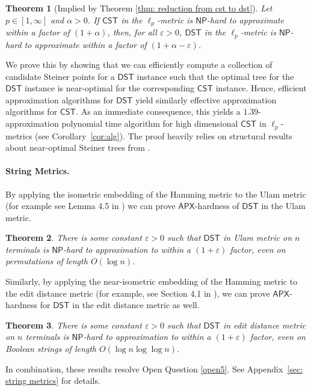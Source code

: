 \documentclass{article}\providecommand{\DeclareRedundantLanguages}[2]{}\usepackage[a4paper,margin=20mm]{geometry}
\newtheorem{theorem}{Theorem}\newtheorem{lemma}[theorem]{Lemma}\newtheorem{proposition}[theorem]{Proposition}\newtheorem{corollary}[theorem]{Corollary}\newtheorem{definition}[theorem]{Definition}\newtheorem{claim}[theorem]{Claim}\newtheorem{remark}[theorem]{Remark}\newtheorem{observation}[theorem]{Observation}\newtheorem{conjecture}[theorem]{Conjecture}\newtheorem{example}[theorem]{Example}
\newcommand{\1}{\textbf{1}}
\newcommand{\cst}{$\mathsf{CST}$\xspace}
\newcommand{\dst}{$\mathsf{DST}$\xspace}
\newcommand{\np}{$\mathsf{NP}$\xspace}
\newcommand{\apx}{$\mathsf{APX}$\xspace}
\begin{document}
\begin{theorem}[Implied by Theorem \ref{thm: reduction from cst to dst}]\label{thm:csttodstintro}
Let $p \in [1,\infty]$ and $\alpha>0$. If \cst in the $\ell_p$-metric is \np-hard to approximate within a factor of $(1 + \alpha)$, then, for all $\varepsilon > 0$, \dst in the $\ell_p$-metric is \np-hard to approximate within a factor of $(1 + \alpha - \varepsilon)$.
\end{theorem}


We prove this by showing that we can efficiently compute  a collection of candidate Steiner points for a \dst instance such that the optimal tree for the \dst instance is near-optimal for the corresponding \cst instance. Hence, efficient approximation algorithms for \dst yield similarly effective approximation algorithms for \cst. As an immediate consequence, this yields a $1.39$-approximation polynomial time algorithm for high dimensional \cst in $\ell_p$-metrics (see Corollary~\ref{cor:alg}). The proof heavily relies on structural results about near-optimal Steiner trees from \cite{DuZhangFeng91, Borchers97, Bartal_Gottlieb_2021}. 

 \paragraph{String Metrics.} By applying the isometric embedding of the 
Hamming metric to the Ulam metric (for example see Lemma 4.5 in \cite{DBLP:journals/corr/abs-2112-03222}) we can prove \apx-hardness of \dst in the Ulam metric. 
\begin{theorem} \label{thm: ulam hardness}
There is some constant $\varepsilon > 0$ such that \dst in Ulam metric on $n$ terminals is \np-hard to approximation to within a $(1+\varepsilon)$ factor, even on permutations of length $O(\log n)$. 
\end{theorem}
Similarly, by applying the near-isometric embedding of the Hamming metric to the edit distance metric (for example, see Section 4.1 in \cite{DBLP:conf/stoc/Rubinstein18}), we can prove \apx-hardness for \dst in the edit distance metric  as well. 
\begin{theorem} \label{thm: edit hardness}
There is some constant $\varepsilon > 0$ such that \dst in edit distance metric on $n$ terminals is \np-hard to approximation to within a $(1+\varepsilon)$ factor, even on Boolean strings of length $O(\log n \log \log n)$. 
\end{theorem}
In combination, these results resolve Open Question \ref{open5}. See Appendix~\ref{sec: string metrics} for details.
\end{document}
